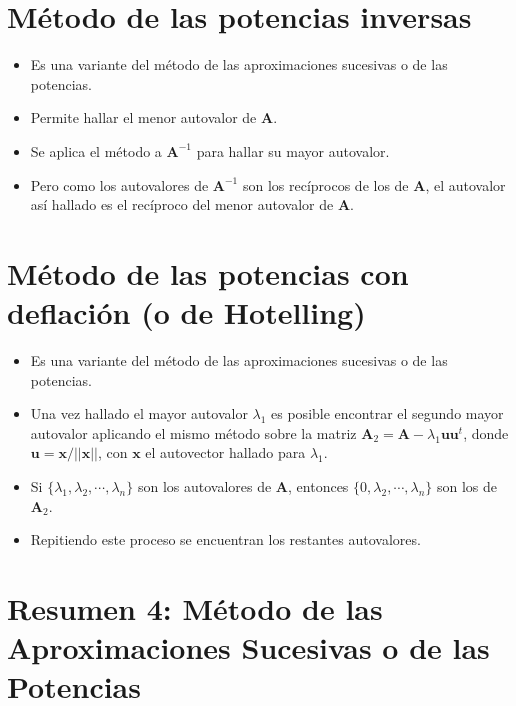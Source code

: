 \documentclass[openany]{book}
\providecommand{\tightlist}{%
  \setlength{\itemsep}{0pt}\setlength{\parskip}{0pt}}
\begin{document}
\hypertarget{muxe9todo-de-las-potencias-inversas}{%
\section{Método de las potencias inversas}\label{muxe9todo-de-las-potencias-inversas}}

\begin{itemize}
\tightlist
\item
  Es una variante del método de las aproximaciones sucesivas o de las potencias.
\item
  Permite hallar el menor autovalor de \(\textbf{A}\).
\item
  Se aplica el método a \(\textbf{A}^{-1}\) para hallar su mayor autovalor.
\item
  Pero como los autovalores de \(\textbf{A}^{-1}\) son los recíprocos de los de \(\textbf{A}\), el autovalor así hallado es el recíproco del menor autovalor de \(\textbf{A}\).
\end{itemize}

\hypertarget{muxe9todo-de-las-potencias-con-deflaciuxf3n-o-de-hotelling}{%
\section{Método de las potencias con deflación (o de Hotelling)}\label{muxe9todo-de-las-potencias-con-deflaciuxf3n-o-de-hotelling}}

\begin{itemize}
\item
  Es una variante del método de las aproximaciones sucesivas o de las potencias.
\item
  Una vez hallado el mayor autovalor \(\lambda_1\) es posible encontrar el segundo mayor autovalor aplicando el mismo método sobre la matriz \(\textbf{A}_2 = \textbf{A} - \lambda_1 \textbf{u} \textbf{u}^t\), donde \(\textbf{u} = \textbf{x} / ||\textbf{x}||\), con \(\textbf{x}\) el autovector hallado para \(\lambda_1\).
\item
  Si \(\{\lambda_1, \lambda_2, \cdots, \lambda_n\}\) son los autovalores de \(\textbf{A}\), entonces \(\{0, \lambda_2, \cdots, \lambda_n\}\) son los de \(\textbf{A}_2\).
\item
  Repitiendo este proceso se encuentran los restantes autovalores.
\end{itemize}

\hypertarget{resumen-4-muxe9todo-de-las-aproximaciones-sucesivas-o-de-las-potencias}{%
\section{Resumen 4: Método de las Aproximaciones Sucesivas o de las Potencias}\label{resumen-4-muxe9todo-de-las-aproximaciones-sucesivas-o-de-las-potencias}}
\end{document}
